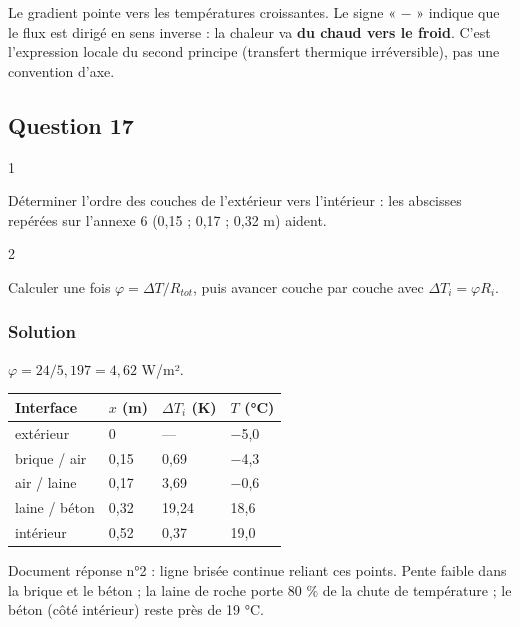 \documentclass[11pt,a4paper]{article}
\begin{document}
Le gradient pointe vers les températures croissantes. Le signe « − » indique que le flux est dirigé en sens inverse : la chaleur va \textbf{du chaud vers le froid}. C'est l'expression locale du second principe (transfert thermique irréversible), pas une convention d'axe.

\hypertarget{question-17}{%
\subsection{Question 17}\label{question-17}}

\begin{indication}{1}

Déterminer l'ordre des couches de l'extérieur vers l'intérieur : les abscisses repérées sur l'annexe 6 (0,15 ; 0,17 ; 0,32 m) aident.

\end{indication}

\begin{indication}{2}

Calculer une fois \(\varphi=\Delta T/R_{tot}\), puis avancer couche par couche avec \(\Delta T_i=\varphi R_i\).

\end{indication}

\hypertarget{solution-16}{%
\subsubsection{Solution}\label{solution-16}}

\(\varphi=24/5{,}197=4{,}62\) W/m².

\begin{longtable}[]{@{}llll@{}}
\toprule\noalign{}
Interface & \(x\) (m) & \(\Delta T_i\) (K) & \(T\) (°C) \\
\midrule\noalign{}
\endhead
\bottomrule\noalign{}
\endlastfoot
extérieur & 0 & --- & −5,0 \\
brique / air & 0,15 & 0,69 & −4,3 \\
air / laine & 0,17 & 3,69 & −0,6 \\
laine / béton & 0,32 & 19,24 & 18,6 \\
intérieur & 0,52 & 0,37 & 19,0 \\
\end{longtable}

Document réponse n°2 : ligne brisée continue reliant ces points. Pente faible dans la brique et le béton ; la laine de roche porte 80 \% de la chute de température ; le béton (côté intérieur) reste près de 19 °C.
\end{document}
